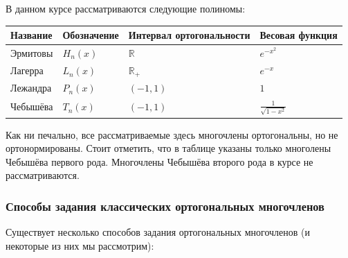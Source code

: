 \documentclass[12pt]{article}
\begin{document}
		В данном курсе рассматриваются следующие полиномы:

		\begin{table}[!th]
			\begin{tabular}{|l|l|l|l|}
				\hline
				Название & Обозначение & Интервал ортогональности & Весовая функция \\
				\hline
				Эрмитовы & $H_n(x)$ & $\mathbb{R}$ & $e^{-x^2}$ \\
				Лагерра  & $L_n(x)$ & $\mathbb{R}_+$ & $e^{-x}$ \\
				Лежандра & $P_n(x)$ & $(-1, 1)$ & $1$ \\
				Чебышёва & $T_n(x)$ & $(-1, 1)$ & $\frac{1}{\sqrt{1-x^2}}$ \\
				\hline
			\end{tabular}
		\end{table}
	
		Как ни печально, все рассматриваемые здесь многочлены ортогональны, но не ортонормированы.
		Стоит отметить, что в таблице указаны только многолены Чебышёва первого рода. Многочлены Чебышёва
		второго рода в курсе не рассматриваются.
	
		\subsubsection{Способы задания классических ортогональных многочленов}

			Существует несколько способов задания ортогональных многочленов (и некоторые из них мы
			рассмотрим):
\end{document}
